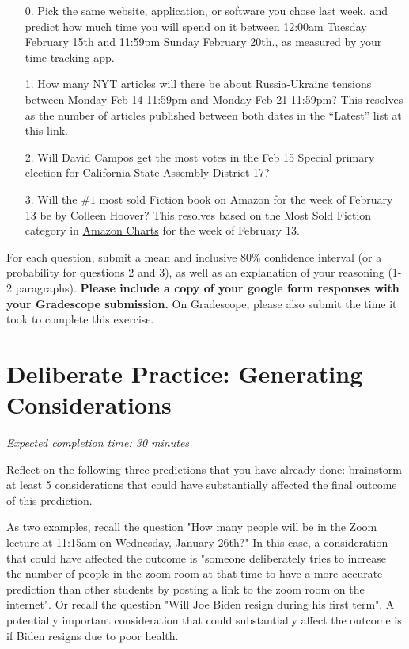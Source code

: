 \documentclass[11pt]{article}
\begin{document}
\begin{enumerate}
	\item[0.] Pick the same website, application, or software you chose last week, and predict how much time you will spend on it between 12:00am Tuesday February 15th and 11:59pm Sunday February 20th., as measured by your time-tracking app.

	\item[1.] How many NYT articles will there be about Russia-Ukraine tensions between Monday Feb 14 11:59pm and Monday Feb 21 11:59pm? This resolves as the number of articles published between both dates in the ``Latest'' list at \href{https://www.nytimes.com/news-event/ukraine-russia?name=styln-russia-ukraine&region=TOP_BANNER&block=storyline_menu_recirc&action=click&pgtype=LegacyCollection&variant=0_Control}{this link}.
	
	\item[2.] Will David Campos get the most votes in the Feb 15 Special primary election for California State Assembly District 17?
 
	\item[3.] Will the $\#1$ most sold Fiction book on Amazon for the week of February 13 be by Colleen Hoover? This resolves based on the Most Sold Fiction category in \href{https://www.amazon.com/charts/}{Amazon Charts} for the week of February 13.
\end{enumerate}

For each question, submit a mean and inclusive 80\% confidence interval (or a probability for questions 2 and 3), as well as an explanation of your reasoning (1-2 paragraphs). \textbf{Please include a copy of your google form responses with your Gradescope submission.} On Gradescope, please also submit the time it took to complete this exercise.

\section*{Deliberate Practice: Generating Considerations}

\emph{Expected completion time: 30 minutes}

Reflect on the following three predictions that you have already done: brainstorm at least 5 considerations that could have substantially affected the final outcome of this prediction.

As two examples, recall the question "How many people will be in the Zoom lecture at 11:15am on Wednesday, January 26th?" In this case, a consideration that could have affected the outcome is "someone deliberately tries to increase the number of people in the zoom room at that time to have a more accurate prediction than other students by posting a link to the zoom room on the internet". Or recall the question "Will Joe Biden resign during his first term". A potentially important consideration that could substantially affect the outcome is if Biden resigns due to poor health.
\end{document}
